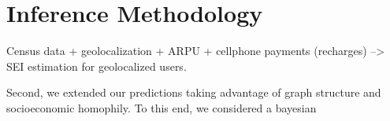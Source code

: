 \section{Inference Methodology}


Census data + geolocalization + ARPU + cellphone payments (recharges)  --> SEI estimation for geolocalized users. 

Second, we extended our predictions taking advantage of graph structure and socioeconomic homophily. To this end, we considered a bayesian  
